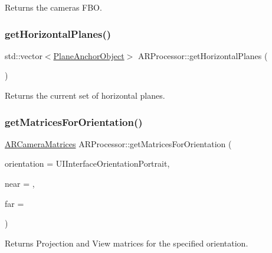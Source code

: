 Returns the camera\textquotesingle{}s F\+BO. 

\mbox{\label{class_a_r_processor_a3cd70af245be375d56a06e2ea8d068f9}} 
\subsubsection{\texorpdfstring{get\+Horizontal\+Planes()}{getHorizontalPlanes()}}
{\footnotesize\ttfamily std\+::vector$<$\hyperlink{struct_a_r_objects_1_1_plane_anchor_object}{Plane\+Anchor\+Object}$>$ A\+R\+Processor\+::get\+Horizontal\+Planes (\begin{DoxyParamCaption}{ }\end{DoxyParamCaption})\hspace{0.3cm}{\ttfamily [inline]}}



Returns the current set of horizontal planes. 

\mbox{\label{class_a_r_processor_abcd684d805e880aed72c2eb56a65978f}} 
\subsubsection{\texorpdfstring{get\+Matrices\+For\+Orientation()}{getMatricesForOrientation()}}
{\footnotesize\ttfamily \hyperlink{struct_a_r_common_1_1_a_r_camera_matrices}{A\+R\+Camera\+Matrices} A\+R\+Processor\+::get\+Matrices\+For\+Orientation (\begin{DoxyParamCaption}\item[{U\+I\+Interface\+Orientation}]{orientation = {\ttfamily UIInterfaceOrientationPortrait},  }\item[{float}]{near = {},  }\item[{float}]{far = {} }\end{DoxyParamCaption})}



Returns Projection and View matrices for the specified orientation. 

\mbox{\label{class_a_r_processor_a0f7cf764c73a8fc3964be088156766ea}} 
